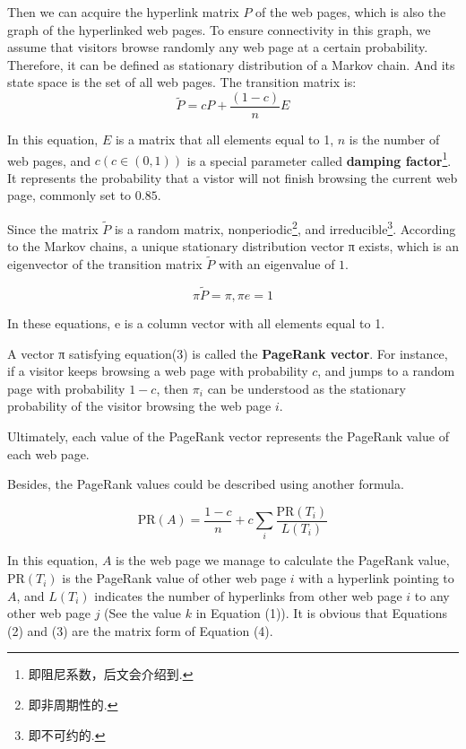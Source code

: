 \documentclass[lettersize,journal,12pt,conference]{IEEEtran}
\begin{document}
Then we can acquire the hyperlink matrix $P$ of the web pages, which is also the graph of the hyperlinked web pages.
To ensure connectivity in this graph, we assume that visitors browse randomly any web page at a certain probability. Therefore, it can be defined as stationary distribution of a Markov chain. And its state space is the set of all web pages. The transition matrix is:
\begin{equation}
	\label{eq:2}
	\widetilde{P} = cP + \frac{(1 - c)}{n}E
\end{equation}

In this equation, $E$ is a matrix that all elements equal to 1, $n$ is the number of web pages, and \(c (c \in (0,1))\) is a special parameter called \textbf{damping factor}\footnote[1]{即阻尼系数，后文会介绍到.}. It represents the probability that a vistor will not finish browsing the current web page, commonly set to $0.85$\cite{ref4}.

Since the matrix $\widetilde{P}$ is a random matrix, nonperiodic\footnote[2]{即非周期性的.}, and irreducible\footnote[3]{即不可约的.}. According to the Markov chains\cite{ref5}, a unique stationary distribution vector π exists, which is an eigenvector of the transition matrix $\widetilde{P}$ with an eigenvalue of $1$\cite{ref6}. 

\begin{equation}
	\label{eq:3}
	\pi \widetilde{P} = \pi , \pi e = 1
\end{equation}

In these equations, e is a column vector with all elements equal to 1. 

A vector π satisfying equation(3) is called the \textbf{PageRank vector}. For instance, if a visitor keeps browsing a web page with probability $c$, and jumps to a random page with probability $1 - c$, then $\pi_i$ can be understood as the stationary probability of the visitor browsing the web page $i$.

Ultimately, each value of the PageRank vector represents the PageRank value of each web page. 

Besides, the PageRank values could be described using another formula.

\begin{equation}
	\label{eq:4}
	\text{PR}(A) = \frac{1 - c}{n} + c \sum_{i} \frac{\text{PR}(T_i)}{L(T_i)}
\end{equation}

In this equation, $A$ is the web page we manage to calculate the PageRank value,  $\text{PR}(T_i)$ is the PageRank value of other web page $i$ with a hyperlink pointing to $A$, and $L(T_i)$ indicates the number of hyperlinks from other web page $i$  to any other web page $j$ (See the value $k$ in Equation (1)). It is obvious that Equations (2) and (3) are the matrix form of Equation (4).
\end{document}
